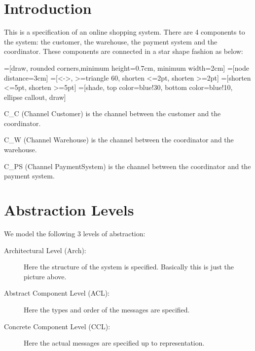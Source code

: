 \documentclass[12pt]{article}
\begin{document}
\section{Introduction}

This is a specification of an online shopping system.  There are 4
components to the system: the customer, the warehouse, the payment
system and the coordinator. These components are connected in a star
shape fashion as below:

=[draw, rounded corners,minimum height=0.7cm, minimum width=2cm]
=[node distance=3cm]
=[<->, >=triangle 60, shorten <=2pt, shorten >=2pt]
=[shorten <=5pt, shorten >=5pt]
=[shade, top color=blue!30, bottom color=blue!10,
                      ellipse callout, draw]
\begin{center}
\end{center}


C\_C (Channel Customer) is the channel between the customer and the
coordinator.

C\_W (Channel Warehouse) is the channel between the coordinator and the
warehouse.

C\_PS (Channel PaymentSystem) is the channel between the coordinator
and the payment system.

\section{Abstraction Levels}

We model the following 3 levels of abstraction:
\begin{description}
\item [Architectural Level (Arch):] Here the structure of the system is
   specified. Basically this is just the picture above.
\item [Abstract Component Level (ACL):] Here the types and order of the
   messages are specified.
\item [Concrete Component Level (CCL):] Here the actual messages are specified
   up to representation.
\end{description}
\end{document}

